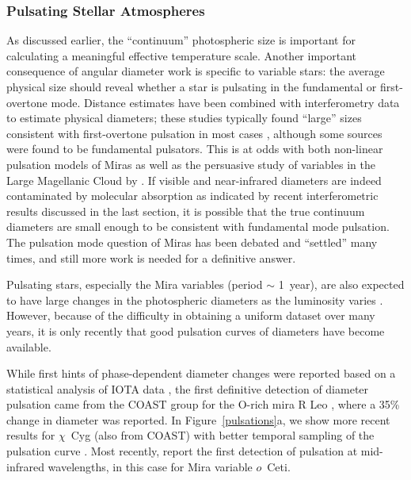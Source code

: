 \documentclass[12pt]{iopart}
\begin{document}
\subsubsection{Pulsating Stellar Atmospheres}

As discussed earlier, the ``continuum'' photospheric size is important
for calculating a meaningful effective temperature scale.  Another
important consequence of angular diameter work is specific to variable
stars: the average physical size should reveal whether a star is
pulsating in the fundamental or first-overtone mode.  Distance
estimates have been combined with interferometry data to
estimate physical diameters; these studies typically found
``large'' sizes consistent with first-overtone pulsation
in most cases \citep[e.g.,][]{hst1995,leeuwen1997,whitelock2000},
although some sources were found to be fundamental pulsators.  This is
at odds with both non-linear pulsation models of Miras
\citep{bessell1996} as well as the persuasive study of variables in
the Large Magellanic Cloud by \citet{wood1996}.  If visible and
near-infrared diameters are indeed contaminated by molecular
absorption as indicated by recent interferometric results discussed in
the last section, it is possible that the true continuum diameters are
small enough to be consistent with fundamental mode pulsation.  The
pulsation mode question of Miras has been debated and ``settled'' many
times, and still more work is needed for a definitive answer.

Pulsating stars, especially the Mira variables (period $\sim$ 1~year),
are also expected to have large changes in the photospheric diameters as
the luminosity varies \citep[e.g.,][]{bessell1989,yaari1996}.
However, because of the difficulty in obtaining a uniform dataset over
many years, it is only recently that good pulsation curves of
diameters have become available.

While first hints of phase-dependent diameter changes were reported
based on a statistical analysis of IOTA data \citep{vanbelle1996}, the
first definitive detection of diameter pulsation came from the COAST
group for the O-rich mira R Leo \citep{burns1998}, where a 35\% change
in diameter was reported.  In Figure~\ref{pulsations}a, we show more
recent results for $\chi$~Cyg (also from COAST) with better temporal
sampling of the pulsation curve \citep{young2000a}.  Most recently,
\citet{weiner2003} report the first detection of pulsation at
mid-infrared wavelengths, in this case for Mira variable $o$~Ceti.
\end{document}
